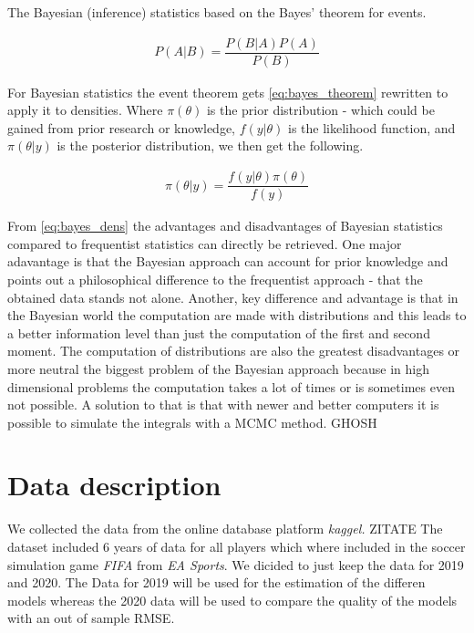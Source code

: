 \documentclass[12pt,a4paper]{article}
\begin{document}
The Bayesian (inference) statistics based on the Bayes' theorem for
events.

\begin{align}
\label{eq:bayes_theorem}
  P(A | B) = \dfrac{P (B | A) P(A)}{P(B)}
\end{align}

For Bayesian statistics the event theorem gets \eqref{eq:bayes_theorem}
rewritten to apply it to densities. Where \(\pi (\theta)\) is the prior
distribution - which could be gained from prior research or knowledge,
\(f(y | \theta )\) is the likelihood function, and \(\pi (\theta| y)\)
is the posterior distribution, we then get the following.

\begin{align}
\label{eq:bayes_dens}
  \pi (\theta | y) = \dfrac{f(y | \theta) \pi(\theta)}{f(y)}
\end{align}

From \eqref{eq:bayes_dens} the advantages and disadvantages of Bayesian
statistics compared to frequentist statistics can directly be retrieved.
One major adavantage is that the Bayesian approach can account for prior
knowledge and points out a philosophical difference to the frequentist
approach - that the obtained data stands not alone. Another, key
difference and advantage is that in the Bayesian world the computation
are made with distributions and this leads to a better information level
than just the computation of the first and second moment. The
computation of distributions are also the greatest disadvantages or more
neutral the biggest problem of the Bayesian approach because in high
dimensional problems the computation takes a lot of times or is
sometimes even not possible. A solution to that is that with newer and
better computers it is possible to simulate the integrals with a
\ac{MCMC} method. GHOSH

\newpage

\hypertarget{data-description}{%
\section{Data description}\label{data-description}}

We collected the data from the online database platform \emph{kaggel.}
ZITATE The dataset included 6 years of data for all players which where
included in the soccer simulation game \emph{FIFA} from \emph{EA
Sports}. We dicided to just keep the data for 2019 and 2020. The Data
for 2019 will be used for the estimation of the differen models whereas
the 2020 data will be used to compare the quality of the models with an
out of sample \ac{RMSE}.
\end{document}
